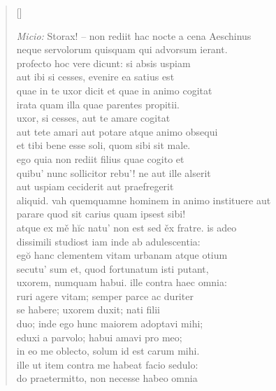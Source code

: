 


\settowidth{\versewidth}{aliquid. vah quemquamne hominem in animo instituere aut}
\begin{verse}[\versewidth]

\textit{Micio:} Storax! – non rediit hac nocte a cena Aeschinus\\
    neque servolorum quisquam qui advorsum ierant.\\
    profecto hoc vere dicunt: si absis uspiam\\
    aut ibi si cesses, evenire ea satius est\\
    quae in te uxor dicit et quae in animo cogitat\\
    irata quam illa quae parentes propitii.\\
    uxor, si cesses, aut te amare cogitat\\
    aut tete amari aut potare atque animo obsequi\\
    et tibi bene esse soli, quom sibi sit male.\\
    ego quia non rediit filius quae cogito et\\
    quibu' nunc sollicitor rebu'! ne aut ille alserit\\
    aut uspiam ceciderit aut praefregerit\\
    aliquid. vah quemquamne hominem in animo instituere aut\\
    parare quod sit carius quam ipsest sibi!\\
    atque ex mě hĭc natu' non est sed ěx fratre. is adeo\\
    dissimili studiost iam inde ab adulescentia:\\
    egŏ hanc clementem vitam urbanam atque otium\\
    secutu' sum et, quod fortunatum isti putant,\\
    uxorem, numquam habui. ille contra haec omnia:\\
    ruri agere vitam; semper parce ac duriter\\
    se habere; uxorem duxit; nati filii\\
    duo; inde ego hunc maiorem adoptavi mihi;\\
    eduxi a parvolo; habui amavi pro meo;\\
    in eo me oblecto, solum id est carum mihi.\\
    ille ut item contra me habeat facio sedulo:\\
    do praetermitto, non necesse habeo omnia\\

\end{verse}
